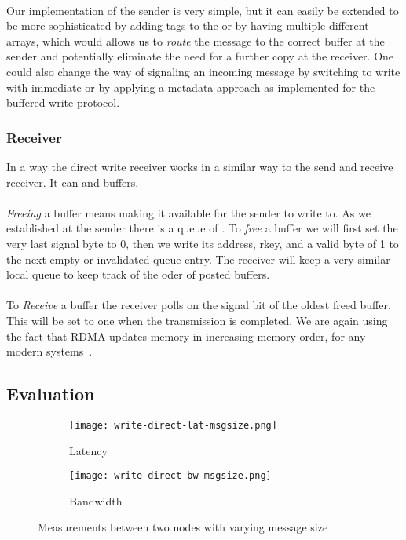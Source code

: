 \paragraph{} Our implementation of the sender is very simple, but it can easily be extended to be more sophisticated by adding
tags to the  or by having multiple different arrays, which would allows us to \emph{route} the message to the
correct buffer at the sender and potentially eliminate the need for a further copy at the receiver. One could also change
the way of signaling an incoming message by switching to write with immediate or by applying a metadata approach as implemented
for the buffered write protocol.

\subsubsection{Receiver}

In a way the direct write receiver works in a similar way to the send and receive receiver. It can  and 
 buffers. 

\paragraph{}\emph{Freeing} a buffer means making it available for the sender to write to. As we established at the sender 
there is a queue of . To \emph{free} a buffer we will first set the very last signal byte to 0, then we
write its address, rkey, and a valid byte of 1 to the next empty or invalidated queue entry. The receiver will keep a very 
similar local queue to keep track of the oder of posted buffers.

\paragraph{} To \emph{Receive} a buffer the receiver polls on the signal bit of the oldest freed buffer. This will be set
to one when the transmission is completed. We are again using the fact that RDMA updates memory in increasing memory order, 
for any modern systems~\cite{herd, farm}.

\subsection{Evaluation}


\begin{figure}[htp]
  \centering
\begin{subfigure}[b]{0.49\textwidth}
  \centering
  \texttt{[image: write-direct-lat-msgsize.png]}
  \label{fig:plot-wdir-lat}
  \caption{Latency}
\end{subfigure}
\begin{subfigure}[b]{0.49\textwidth}
  \centering
  \texttt{[image: write-direct-bw-msgsize.png]}
  \caption{Bandwidth}
  \label{fig:plot-wdir-bw}
\end{subfigure}
\caption{Measurements between two nodes with varying message size}
\end{figure}
